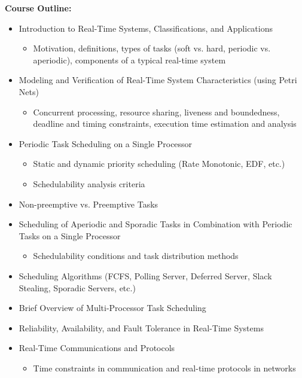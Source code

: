 \documentclass[12pt]{article}
\begin{document}
\textbf{Course Outline:}
\begin{itemize}
    \item Introduction to Real-Time Systems, Classifications, and Applications
    \begin{itemize}
        \item Motivation, definitions, types of tasks (soft vs. hard, periodic vs. aperiodic), components of a typical real-time system
    \end{itemize}
    \item Modeling and Verification of Real-Time System Characteristics (using Petri Nets)
    \begin{itemize}
        \item Concurrent processing, resource sharing, liveness and boundedness, deadline and timing constraints, execution time estimation and analysis
    \end{itemize}
    \item Periodic Task Scheduling on a Single Processor
    \begin{itemize}
        \item Static and dynamic priority scheduling (Rate Monotonic, EDF, etc.)
        \item Schedulability analysis criteria
    \end{itemize}
    \item Non-preemptive vs. Preemptive Tasks
    \item Scheduling of Aperiodic and Sporadic Tasks in Combination with Periodic Tasks on a Single Processor
    \begin{itemize}
        \item Schedulability conditions and task distribution methods
    \end{itemize}
    \item Scheduling Algorithms (FCFS, Polling Server, Deferred Server, Slack Stealing, Sporadic Servers, etc.)
    \item Brief Overview of Multi-Processor Task Scheduling
    \item Reliability, Availability, and Fault Tolerance in Real-Time Systems
    \item Real-Time Communications and Protocols
    \begin{itemize}
        \item Time constraints in communication and real-time protocols in networks
    \end{itemize}
    
\end{itemize}
\end{document}
